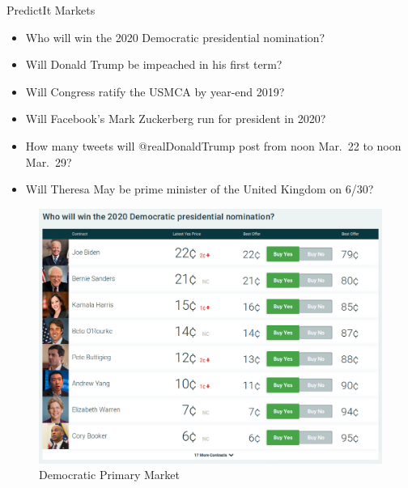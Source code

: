 \documentclass[ignorenonframetext,]{beamer}
\providecommand{\tightlist}{%
  \setlength{\itemsep}{0pt}\setlength{\parskip}{0pt}}
\begin{document}
\begin{frame}{PredictIt Markets}
\protect\hypertarget{predictit-markets}{}

\begin{itemize}
\tightlist
\item
  Who will win the 2020 Democratic presidential nomination?
\item
  Will Donald Trump be impeached in his first term?
\item
  Will Congress ratify the USMCA by year-end 2019?
\item
  Will Facebook's Mark Zuckerberg run for president in 2020?
\item
  How many tweets will @realDonaldTrump post from noon Mar.~22 to noon
  Mar.~29?
\item
  Will Theresa May be prime minister of the United Kingdom on 6/30?
\end{itemize}

\end{frame}

\begin{frame}{}
\protect\hypertarget{section}{}

\begin{figure}
\centering
\includegraphics{2020_dem_primary.png}
\caption{Democratic Primary Market}
\end{figure}

\end{frame}
\end{document}

